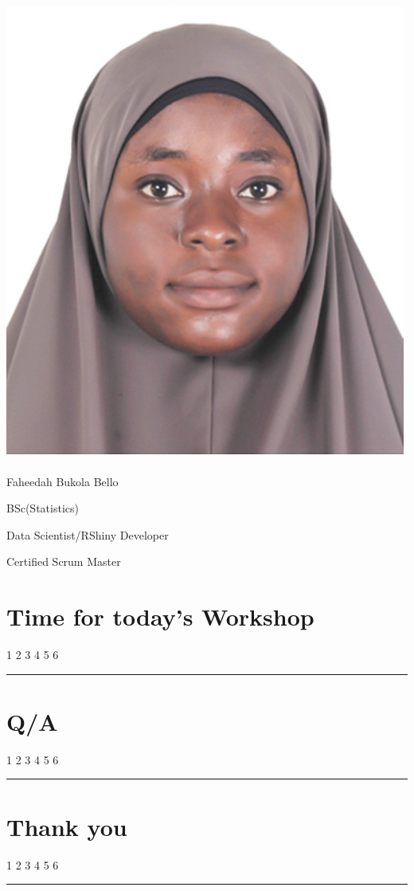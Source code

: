 \documentclass[
  letterpaper,
  DIV=11,
  numbers=noendperiod]{scrartcl}
\begin{document}
\includegraphics[width=5.19792in,height=5.97917in]{images/faheedah.jpg}

Faheedah Bukola Bello

BSc(Statistics)

Data Scientist/RShiny Developer

Certified Scrum Master

\hypertarget{time-for-todays-workshop}{%
\section{Time for today's Workshop}\label{time-for-todays-workshop}}

{1 2} 3 {4 5 6}

\begin{center}\rule{0.5\linewidth}{0.5pt}\end{center}

\hypertarget{qa}{%
\section{Q/A}\label{qa}}

{1 2 3} 4 {5 6}

\begin{center}\rule{0.5\linewidth}{0.5pt}\end{center}

\hypertarget{thank-you}{%
\section{Thank you}\label{thank-you}}

{1 2 3 4} 5 {6}

\begin{center}\rule{0.5\linewidth}{0.5pt}\end{center}
\end{document}
